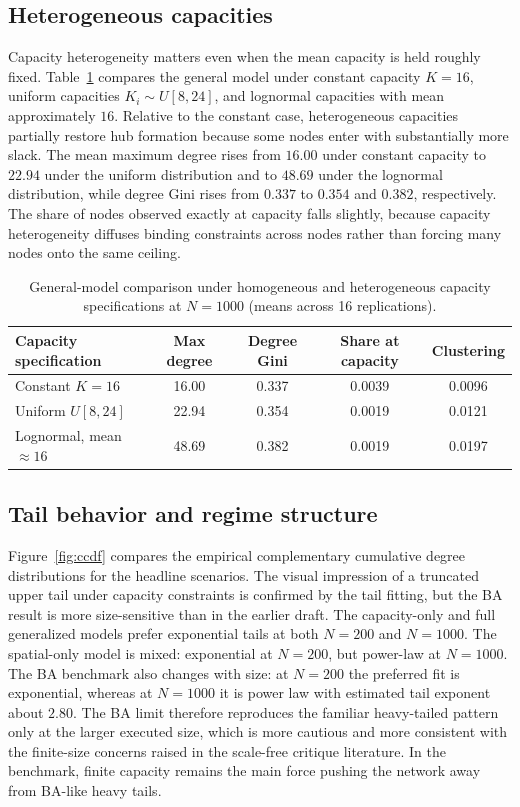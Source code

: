 \documentclass[11pt]{article}
\begin{document}
\subsection{Heterogeneous capacities}

Capacity heterogeneity matters even when the mean capacity is held roughly fixed. Table~\ref{tab:heterogeneous-capacity} compares the general model under constant capacity $K=16$, uniform capacities $K_i\sim U[8,24]$, and lognormal capacities with mean approximately $16$. Relative to the constant case, heterogeneous capacities partially restore hub formation because some nodes enter with substantially more slack. The mean maximum degree rises from $16.00$ under constant capacity to $22.94$ under the uniform distribution and to $48.69$ under the lognormal distribution, while degree Gini rises from $0.337$ to $0.354$ and $0.382$, respectively. The share of nodes observed exactly at capacity falls slightly, because capacity heterogeneity diffuses binding constraints across nodes rather than forcing many nodes onto the same ceiling.

\begin{table}[htbp]
\centering
\caption{General-model comparison under homogeneous and heterogeneous capacity specifications at $N=1000$ (means across 16 replications).}
\label{tab:heterogeneous-capacity}
\begin{tabular}{lcccc}
\toprule
Capacity specification & Max degree & Degree Gini & Share at capacity & Clustering \\
\midrule
Constant $K=16$ & 16.00 & 0.337 & 0.0039 & 0.0096 \\
Uniform $U[8,24]$ & 22.94 & 0.354 & 0.0019 & 0.0121 \\
Lognormal, mean $\approx 16$ & 48.69 & 0.382 & 0.0019 & 0.0197 \\
\bottomrule
\end{tabular}
\end{table}

\subsection{Tail behavior and regime structure}

Figure~\ref{fig:ccdf} compares the empirical complementary cumulative degree distributions for the headline scenarios. The visual impression of a truncated upper tail under capacity constraints is confirmed by the tail fitting, but the BA result is more size-sensitive than in the earlier draft. The capacity-only and full generalized models prefer exponential tails at both $N=200$ and $N=1000$. The spatial-only model is mixed: exponential at $N=200$, but power-law at $N=1000$. The BA benchmark also changes with size: at $N=200$ the preferred fit is exponential, whereas at $N=1000$ it is power law with estimated tail exponent about $2.80$. The BA limit therefore reproduces the familiar heavy-tailed pattern only at the larger executed size, which is more cautious and more consistent with the finite-size concerns raised in the scale-free critique literature. In the benchmark, finite capacity remains the main force pushing the network away from BA-like heavy tails.
\end{document}
